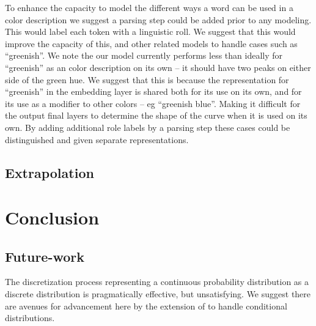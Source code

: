 \documentclass[11pt,letterpaper]{article}
\newcommand{\textcite}{\newcite}
\begin{document}
To enhance the capacity to model the different ways a word can be used in a color description we suggest a parsing step could be added prior to any modeling.
This would label each token with a linguistic roll.
We suggest that this would improve the capacity of this, and other related models to handle cases such as ``greenish''.
We note the our model currently performs less than ideally for ``greenish'' as an color description on its own -- it should have two peaks on either side of the green hue.
We suggest that this is because the representation for ``greenish'' in the embedding layer is shared both for its use on its own, and for its use as a modifier to other colors -- eg ``greenish blue''.
Making it difficult for the output final layers to determine the shape of the curve when it is used on its own.
By adding additional role labels by a parsing step these cases could be distinguished and given separate representations.


\subsection{Extrapolation}





\section{Conclusion}


\subsection{Future-work}



The discretization process representing a continuous probability distribution as a discrete distribution is pragmatically effective, but unsatisfying.
We suggest there are avenues for advancement here by the extension of \textcite{magdon1998neural} to handle conditional distributions.





\end{document}
